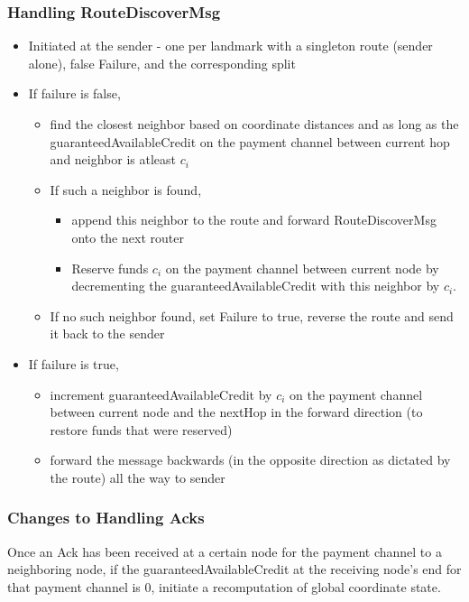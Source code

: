 \documentclass[a4paper]{article}
\begin{document}
\subsubsection{Handling RouteDiscoverMsg}
\begin{itemize}
    \item Initiated at the sender - one per landmark with a singleton route (sender alone), false Failure,
        and the corresponding split
    \item If failure is false, 
        \begin{itemize}
            \item find the closest neighbor based on coordinate distances and as long as the 
                guaranteedAvailableCredit on the payment channel between 
                current hop and neighbor is atleast $c_i$
            \item If such a neighbor is found, 
                \begin{itemize}
                    \item append this neighbor to the route and forward RouteDiscoverMsg 
        onto the next router
                    \item Reserve funds $c_i$ on the payment channel between current node by decrementing the 
                guaranteedAvailableCredit with this neighbor by $c_i$.
        \end{itemize}
            \item If no such neighbor found, set Failure to true, reverse the route and 
                send it back to the sender
        \end{itemize}
    \item If failure is true, 
        \begin{itemize} 
            \item increment guaranteedAvailableCredit by $c_i$ on the payment channel
        between current node and the nextHop in the forward direction (to restore funds that were reserved)
            \item forward the message backwards (in the opposite direction as dictated by 
                the route) all the way to sender
        \end{itemize}
\end{itemize}

\subsubsection{Changes to Handling Acks}
Once an Ack has been received at a certain node for the payment channel to a neighboring node, if the 
guaranteedAvailableCredit at the receiving node's end for that payment channel is $0$, initiate a recomputation
of global coordinate state.
\end{document}
